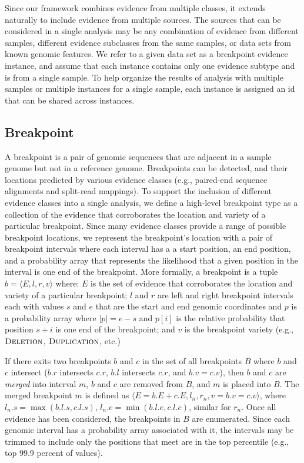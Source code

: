 \documentclass[10pt]{bmc_article}
\newenvironment{bmcformat}{\begin{raggedright}\baselineskip20pt\sloppy\setboolean{publ}{false}}{\end{raggedright}\baselineskip20pt\sloppy}
\begin{document}
\begin{bmcformat}
Since our framework combines evidence from multiple classes, it extends
naturally to include evidence from multiple sources.  The sources that can be
considered in a single analysis may be any combination of evidence from
different samples, different evidence subclasses from the same samples, or
data sets from known genomic features.  We refer to a given data set as a
breakpoint evidence instance, and assume that each instance contains only one
evidence subtype and is from a single sample.  To help organize the results of
analysis with multiple samples or multiple instances for a single sample,
each instance is assigned an id that can be shared across instances.


\subsection*{Breakpoint}

A breakpoint is a pair of genomic sequences that are adjacent in a sample genome
but not in a reference genome. Breakpoints can be detected, and their locations
predicted by various evidence classes (e.g., paired-end sequence alignments and
split-read mappings).  To support the inclusion of different evidence classes
into a single analysis, we define a high-level breakpoint type as a collection
of the evidence that corroborates the location and variety of a particular
breakpoint.  Since many evidence classes provide a range of possible breakpoint
locations, we represent the breakpoint's location with a pair of breakpoint
intervals where each interval has a a start position, an end position, and a
probability array that represents the likelihood that a given position in the
interval is one end of the breakpoint.  More formally, a breakpoint is a tuple
$b=\langle E,l,r,v \rangle$ where: $E$ is the set of evidence that corroborates
the location and variety of a particular breakpoint; $l$ and $r$ are left and
right breakpoint intervals each with values $s$ and $e$ that are the start and
end genomic coordinates and $p$ is a probability array where $|p|=e-s$ and
$p[i]$ is the relative probability that position $s+i$ is one end of the
breakpoint; and $v$ is the breakpoint variety (e.g., $\textsc{Deletion}$,
$\textsc{Duplication}$, etc.)

If there exits two breakpoints $b$ and $c$ in the set of all breakpoints $B$
where $b$ and $c$  intersect ($b.r$ intersects $c.r$, $b.l$ intersects $c.r$,
and $b.v = c.v$), then $b$ and $c$ are {\em merged} into interval $m$, $b$ and
$c$ are removed from $B$, and $m$ is placed into $B$.  The merged breakpoint $m$
is defined as $\langle E = b.E + c.E, l_n, r_n, v = b.v = c.v\rangle$, where
$l_n.s = \max(b.l.s, c.l.s)$, $l_n.e = \min(b.l.e, c.l.e)$, similar for $r_n$.
Once all evidence has been considered, the breakpoints in $B$ are enumerated.
Since each genomic interval has a probability array associated with it, the
intervals may be trimmed to include only the positions that meet are in the top
percentile (e.g., top 99.9 percent of values).


\end{bmcformat}
\end{document}
